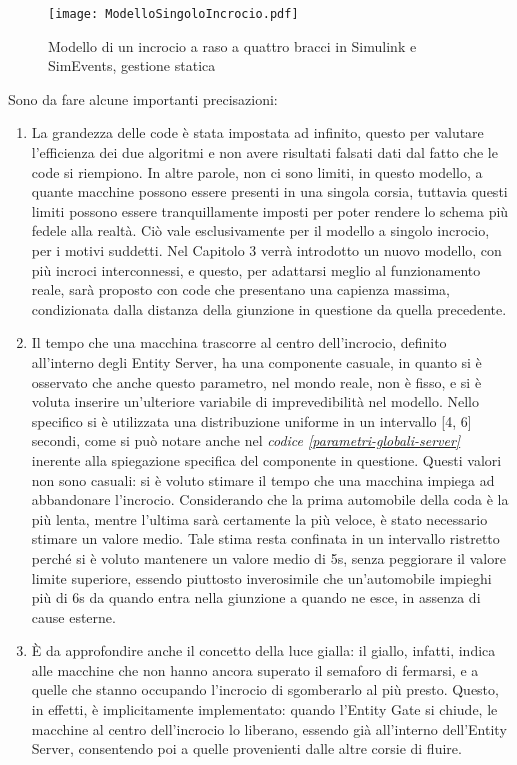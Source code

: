 \begin{figure}[H]
	\centering
	\texttt{[image: ModelloSingoloIncrocio.pdf]}
	\caption{Modello di un incrocio a raso a quattro bracci in Simulink e SimEvents, gestione statica}
	\label{fig: modelloSingoloIncrocio}
\end{figure}
\newpage
Sono da fare alcune importanti precisazioni:
\begin{enumerate}
	\item La grandezza delle code è stata impostata ad infinito, questo per valutare l’efficienza dei due algoritmi e non avere risultati falsati dati dal fatto che le code si riempiono. In altre parole, non ci sono limiti, in questo modello, a quante macchine possono essere presenti in una singola corsia, tuttavia questi limiti possono essere tranquillamente imposti per poter rendere lo schema più fedele alla realtà. Ciò vale esclusivamente per il modello a singolo incrocio, per i motivi suddetti. Nel Capitolo 3 verrà introdotto un nuovo modello, con più incroci interconnessi, e questo, per adattarsi meglio al funzionamento reale, sarà proposto con code che presentano una capienza massima, condizionata dalla distanza della giunzione in questione da quella precedente.
	\item Il tempo che una macchina trascorre al centro dell’incrocio, definito all’interno degli Entity Server, ha una componente casuale, in quanto si è osservato che anche questo parametro, nel mondo reale, non è fisso, e si è voluta inserire un’ulteriore variabile di imprevedibilità nel modello. Nello specifico si è utilizzata una distribuzione uniforme in un intervallo [4, 6] secondi, come si può notare anche nel \textit{codice \ref{parametri-globali-server}} inerente alla spiegazione specifica del componente in questione. Questi valori non sono casuali: si è voluto stimare il tempo che una macchina impiega ad abbandonare l’incrocio. Considerando che la prima automobile della coda è la più lenta, mentre l’ultima sarà certamente la più veloce, è stato necessario stimare un valore medio. Tale stima resta confinata in un intervallo ristretto perché si è voluto mantenere un valore medio di 5s, senza peggiorare il valore limite superiore, essendo piuttosto inverosimile che un’automobile impieghi più di 6s da quando entra nella giunzione a quando ne esce, in assenza di cause esterne.
	\item È da approfondire anche il concetto della luce gialla: il giallo, infatti, indica alle macchine che non hanno ancora superato il semaforo di fermarsi, e a quelle che stanno occupando l’incrocio di sgomberarlo al più presto. Questo, in effetti, è implicitamente implementato: quando l’Entity Gate si chiude, le macchine al centro dell’incrocio lo liberano, essendo già all’interno dell’Entity Server, consentendo poi a quelle provenienti dalle altre corsie di fluire.
\end{enumerate}
